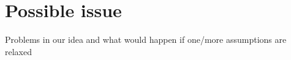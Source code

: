 \section{Possible issue} \label{issues}
Problems in our idea and what would happen if one/more assumptions are relaxed